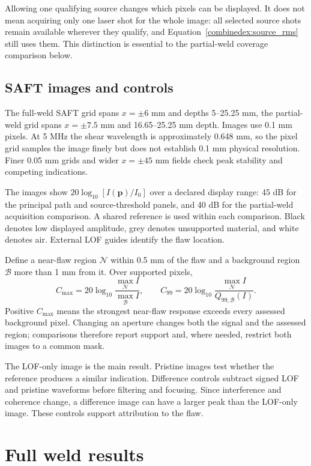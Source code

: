 Allowing one qualifying source changes which pixels can be displayed. It does not mean acquiring only one laser shot for the whole image: all selected source shots remain available wherever they qualify, and Equation~\ref{combinedex:source_rms} still uses them. This distinction is essential to the partial-weld coverage comparison below.

\subsection{SAFT images and controls}
\label{combinedex:metrics}
The full-weld SAFT grid spans $x=\pm6$ mm and depths 5--25.25 mm, the partial-weld grid spans $x=\pm7.5$ mm and 16.65--25.25 mm depth. Images use 0.1 mm pixels. At 5 MHz the shear wavelength is approximately 0.648 mm, so the pixel grid samples the image finely but does not establish 0.1 mm physical resolution. Finer 0.05 mm grids and wider $x=\pm45$ mm fields check peak stability and competing indications.

The images show $20\log_{10}[I(\mathbf p)/I_0]$ over a declared display range: 45 dB for the principal path and source-threshold panels, and 40 dB for the partial-weld acquisition comparison. A shared reference is used within each comparison. Black denotes low displayed amplitude, grey denotes unsupported material, and white denotes air. External LOF guides identify the flaw location. 

Define a near-flaw region $\mathcal N$ within 0.5 mm of the flaw and a background region $\mathcal B$ more than 1 mm from it. Over supported pixels,
\begin{equation}
 C_{\max}=20\log_{10}\frac{\max_{\mathcal N}I}{\max_{\mathcal B}I},\qquad
 C_{99}=20\log_{10}\frac{\max_{\mathcal N}I}{Q_{99,\mathcal B}(I)}.
\end{equation}
Positive $C_{\max}$ means the strongest near-flaw response exceeds every assessed background pixel. Changing an aperture changes both the signal and the assessed region; comparisons therefore report support and, where needed, restrict both images to a common mask.

The LOF-only image is the main result. Pristine images test whether the reference produces a similar indication. Difference controls subtract signed LOF and pristine waveforms before filtering and focusing. Since interference and coherence change, a difference image can have a larger peak than the LOF-only image. These controls support attribution to the flaw.

\section{Full weld results}
\label{combinedex:full}


